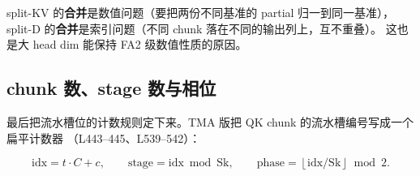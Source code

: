 split-KV 的\textbf{合并}是数值问题（要把两份不同基准的 partial 归一到同一基准），
split-D 的\textbf{合并}是索引问题（不同 chunk 落在不同的输出列上，互不重叠）。
这也是大 head dim 能保持 FA2 级数值性质的原因。

\subsection{chunk 数、stage 数与相位}

最后把流水槽位的计数规则定下来。TMA 版把 QK chunk 的流水槽编号写成一个扁平计数器
（L443--445、L539--542）：

\begin{equation}
  \mathrm{idx} = t \cdot C + c , \qquad
  \mathrm{stage} = \mathrm{idx} \bmod \mathrm{Sk} , \qquad
  \mathrm{phase} = \left\lfloor \mathrm{idx} / \mathrm{Sk} \right\rfloor \bmod 2 .
  \label{eq:19-phase}
\end{equation}

